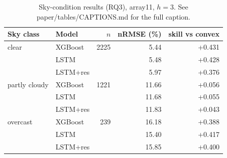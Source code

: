 \begin{table}[t]
  \centering
  \small
  \caption{Sky-condition results (RQ3), array11, $h=3$. See paper/tables/CAPTIONS.md for the full caption.}
  \label{tab:sky-condition}
  \begin{tabular}{llrrr}
    \toprule
    Sky class & Model & $n$ & nRMSE (\%) & skill vs convex \\
    \midrule
    clear & XGBoost & 2225 & 5.44 & +0.431 \\
     & LSTM &  & 5.48 & +0.428 \\
     & LSTM+res &  & 5.97 & +0.376 \\
    \addlinespace
    partly cloudy & XGBoost & 1221 & 11.66 & +0.056 \\
     & LSTM &  & 11.68 & +0.055 \\
     & LSTM+res &  & 11.83 & +0.043 \\
    \addlinespace
    overcast & XGBoost & 239 & 16.18 & +0.388 \\
     & LSTM &  & 15.40 & +0.417 \\
     & LSTM+res &  & 15.85 & +0.400 \\
    \bottomrule
  \end{tabular}
\end{table}
